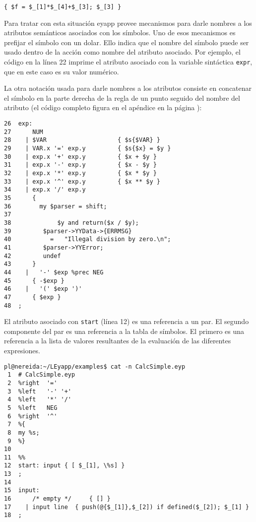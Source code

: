 \begin{verbatim}
{ $f = $_[1]*$_[4]+$_[3]; $_[3] }
\end{verbatim}


Para tratar con esta situación eyapp provee mecanismos para darle nombres a
los atributos semánticos asociados con los símbolos. Uno de esos mecanismos
es prefijar el símbolo con un dolar. Ello indica que el nombre del símbolo
puede ser usado dentro de la acción como nombre del atributo asociado.
Por ejemplo, el código en la línea 22 imprime el atributo asociado
con la variable sintáctica \verb|expr|, que en este caso es su valor numérico.


La otra notación usada para darle nombres a los atributos consiste
en concatenar el símbolo en la parte derecha de la regla de un punto seguido
del nombre del atributo
(el código completo figura en el apéndice en la página \pageref{apendice:calcyp}):


\begin{verbatim}
26  exp:
27      NUM
28    | $VAR                    { $s{$VAR} }
29    | VAR.x '=' exp.y         { $s{$x} = $y }
30    | exp.x '+' exp.y         { $x + $y }
31    | exp.x '-' exp.y         { $x - $y }
32    | exp.x '*' exp.y         { $x * $y }
33    | exp.x '^' exp.y         { $x ** $y }
34    | exp.x '/' exp.y
35      {
36        my $parser = shift;
37
38             $y and return($x / $y);
39         $parser->YYData->{ERRMSG}
40           =   "Illegal division by zero.\n";
41         $parser->YYError;
42         undef
43      }
44    |   '-' $exp %prec NEG
45      { -$exp }
46    |   '(' $exp ')'
47      { $exp }
48  ;
\end{verbatim}




El atributo asociado con \verb|start| (línea 12) es una referencia a
un par. El segundo componente del par es una referencia a la tabla de símbolos.
El primero es una referencia a la lista de valores resultantes de la evaluación 
de las diferentes expresiones.

\begin{verbatim}
pl@nereida:~/LEyapp/examples$ cat -n CalcSimple.eyp
 1  # CalcSimple.eyp
 2  %right  '='
 3  %left   '-' '+'
 4  %left   '*' '/'
 5  %left   NEG
 6  %right  '^'
 7  %{
 8  my %s;
 9  %}
10
11  %%
12  start: input { [ $_[1], \%s] }
13  ;
14
15  input:
16      /* empty */     { [] }
17    | input line  { push(@{$_[1]},$_[2]) if defined($_[2]); $_[1] }
18  ;
\end{verbatim}

